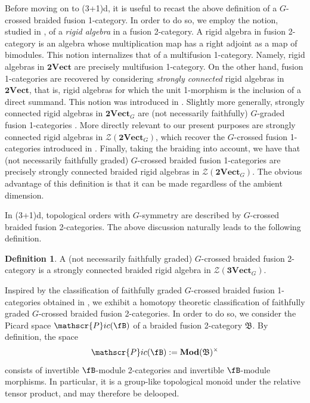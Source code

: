 \documentclass[11pt,reqno]{amsart}
\newcommand{\sPic}{\mathscr{P}ic}
\newcommand{\cZ}{\mathcal{Z}}
\numberwithin{equation}{section}
\theoremstyle{plain}
\theoremstyle{definition}
\newtheorem{defn}[equation]{Definition}
\begin{document}
Before moving on to (3+1)d, it is useful to recast the above definition of a $G$-crossed braided fusion 1-category. In order to do so, we employ the notion, studied in \cite{D7}, of a \textit{rigid algebra} in a fusion 2-category. A rigid algebra in fusion 2-category is an algebra whose multiplication map has a right adjoint as a map of bimodules. This notion internalizes that of a multifusion 1-category. Namely, rigid algebras in $\mathbf{2Vect}$ are precisely multifusion 1-category. On the other hand, fusion 1-categories are recovered by considering \textit{strongly connected} rigid algebras in $\mathbf{2Vect}$, that is, rigid algebras for which the unit 1-morphism is the inclusion of a direct summand. This notion was introduced in \cite{JFR}. Slightly more generally, strongly connected rigid algebras in $\mathbf{2Vect}_G$ are (not necessarily faithfully) $G$-graded fusion 1-categories \cite[Example 5.2.4]{D4}. More directly relevant to our present purposes are strongly connected rigid algebras in $\mathcal{Z}(\mathbf{2Vect}_G)$, which recover the $G$-crossed fusion 1-categories introduced in \cite{Tur}. Finally, taking the braiding into account, we have that (not necessarily faithfully graded) $G$-crossed braided fusion 1-categories are precisely strongly connected braided rigid algebras in $\mathcal{Z}(\mathbf{2Vect}_G)$. The obvious advantage of this definition is that it can be made regardless of the ambient dimension.

In (3+1)d, topological orders with $G$-symmetry are described by $G$-crossed braided fusion 2-categories. The above discussion naturally leads to the following definition.

\begin{defn}\label{def:GcrossedBF2C}
A (not necessarily faithfully graded) $G$-crossed braided fusion 2-category is a strongly connected braided rigid algebra in $\cZ(\mathbf{3Vect}_G)$.
\end{defn}


Inspired by the classification of faithfully graded $G$-crossed braided fusion 1-categories obtained in \cite{ENO2}, we exhibit a homotopy theoretic classification of faithfully graded $G$-crossed braided fusion 2-categories. In order to do so, we consider the Picard space $\sPic(\fB)$ of a braided fusion 2-category $\mathfrak{B}$. By definition, the space $$\sPic(\fB):=\mathbf{Mod}(\mathfrak{B})^{\times}$$ consists of invertible $\fB$-module 2-categories and invertible $\fB$-module morphisms. In particular, it is a group-like topological monoid under the relative tensor product, and may therefore be delooped.
\end{document}
